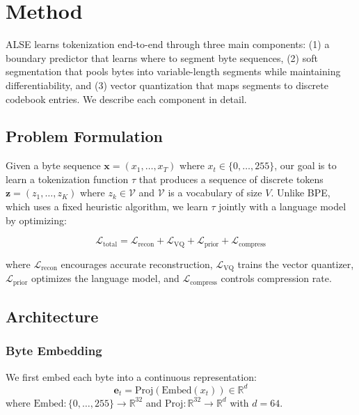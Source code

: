 \documentclass{article}
\begin{document}
\section{Method}

ALSE learns tokenization end-to-end through three main components: (1) a boundary predictor that learns where to segment byte sequences, (2) soft segmentation that pools bytes into variable-length segments while maintaining differentiability, and (3) vector quantization that maps segments to discrete codebook entries. We describe each component in detail.

\subsection{Problem Formulation}

Given a byte sequence $\mathbf{x} = (x_1, \ldots, x_T)$ where $x_t \in \{0, \ldots, 255\}$, our goal is to learn a tokenization function $\tau$ that produces a sequence of discrete tokens $\mathbf{z} = (z_1, \ldots, z_K)$ where $z_k \in \mathcal{V}$ and $\mathcal{V}$ is a vocabulary of size $V$. Unlike BPE, which uses a fixed heuristic algorithm, we learn $\tau$ jointly with a language model by optimizing:

\begin{equation}
\mathcal{L}_{\text{total}} = \mathcal{L}_{\text{recon}} + \mathcal{L}_{\text{VQ}} + \mathcal{L}_{\text{prior}} + \mathcal{L}_{\text{compress}}
\end{equation}

where $\mathcal{L}_{\text{recon}}$ encourages accurate reconstruction, $\mathcal{L}_{\text{VQ}}$ trains the vector quantizer, $\mathcal{L}_{\text{prior}}$ optimizes the language model, and $\mathcal{L}_{\text{compress}}$ controls compression rate.

\subsection{Architecture}

\subsubsection{Byte Embedding}

We first embed each byte into a continuous representation:
\begin{equation}
\mathbf{e}_t = \text{Proj}(\text{Embed}(x_t)) \in \mathbb{R}^{d}
\end{equation}
where $\text{Embed}: \{0, \ldots, 255\} \rightarrow \mathbb{R}^{32}$ and $\text{Proj}: \mathbb{R}^{32} \rightarrow \mathbb{R}^{d}$ with $d=64$.
\end{document}
